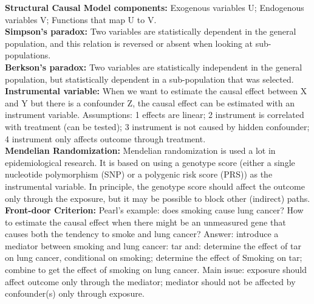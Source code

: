 \documentclass[a4paper,7pt,landscape]{extarticle}
\begin{document}
\begin{multicols}{3}
\begin{boxA}
\textbf{Structural Causal Model components:} Exogenous variables U; Endogenous variables V; Functions that map U to V.\\
\textbf{Simpson's paradox:} Two variables are statistically dependent in the general population, and this relation is reversed or absent when looking at sub-populations.\\
\textbf{Berkson's paradox:} Two variables are statistically independent in the general population, but statistically dependent in a sub-population that was selected.\\
\textbf{Instrumental variable:} When we want to estimate the causal effect between X and Y but there is a confounder Z, the causal effect can be estimated with an instrument variable. Assumptions: 1 effects are linear; 2 instrument is correlated with treatment (can be tested); 3 instrument is not caused by hidden confounder; 4 instrument only affects outcome through treatment.\\
\textbf{Mendelian Randomization:} Mendelian randomization is used a lot in epidemiological research. It is based on using a genotype score (either a single nucleotide polymorphism (SNP) or a polygenic risk score (PRS)) as the instrumental variable. In principle, the genotype score should affect the outcome only through the exposure, but it may be possible to block other (indirect) paths.\\
\textbf{Front-door Criterion:} Pearl's example: does smoking cause lung cancer? How to estimate the causal effect when there might be an unmeasured gene that causes both the tendency to smoke and lung cancer? Answer: introduce a mediator between smoking and lung cancer: tar and: determine the effect of tar on lung cancer, conditional on smoking; determine the effect of Smoking on tar; combine to get the effect of smoking on lung cancer. Main issue: exposure should affect outcome only through the mediator; mediator should not be affected by confounder(s) only through exposure.
    
\end{boxA}


\end{multicols}
\end{document}
